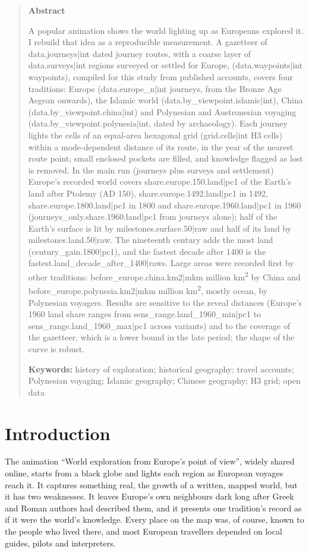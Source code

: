 \documentclass[11pt,a4paper]{article}
\begin{document}
\begin{quote}
\small
\begin{center}\textbf{Abstract}\end{center}
A popular animation shows the world lighting up as Europeans explored it. I rebuild that idea as a reproducible measurement. A gazetteer of {{data.journeys|int}} dated journey routes, with a coarse layer of {{data.surveys|int}} regions surveyed or settled for Europe, ({{data.waypoints|int}} waypoints), compiled for this study from published accounts, covers four traditions: Europe ({{data.europe_n|int}} journeys, from the Bronze Age Aegean onwards), the Islamic world ({{data.by_viewpoint.islamic|int}}), China ({{data.by_viewpoint.china|int}}) and Polynesian and Austronesian voyaging ({{data.by_viewpoint.polynesia|int}}, dated by archaeology). Each journey lights the cells of an equal-area hexagonal grid ({{grid.cells|int}} H3 cells) within a mode-dependent distance of its route, in the year of the nearest route point; small enclosed pockets are filled, and knowledge flagged as lost is removed. In the main run (journeys plus surveys and settlement) Europe's recorded world covers {{share.europe.150.land|pc1}} of the Earth's land after Ptolemy (AD 150), {{share.europe.1492.land|pc1}} in 1492, {{share.europe.1800.land|pc1}} in 1800 and {{share.europe.1960.land|pc1}} in 1960 ({{journeys_only.share.1960.land|pc1}} from journeys alone); half of the Earth's surface is lit by {{milestones.surface.50|raw}} and half of its land by {{milestones.land.50|raw}}. The nineteenth century adds the most land ({{century_gain.1800|pc1}}), and the fastest decade after 1400 is the {{fastest.land_decade_after_1400|raw}}s. Large areas were recorded first by other traditions: {{before_europe.china.km2|mkm}} million km\textsuperscript{2} by China and {{before_europe.polynesia.km2|mkm}} million km\textsuperscript{2}, mostly ocean, by Polynesian voyagers. Results are sensitive to the reveal distances (Europe's 1960 land share ranges from {{sens_range.land_1960_min|pc1}} to {{sens_range.land_1960_max|pc1}} across variants) and to the coverage of the gazetteer, which is a lower bound in the late period; the shape of the curve is robust.

\textbf{Keywords:} history of exploration; historical geography; travel accounts; Polynesian voyaging; Islamic geography; Chinese geography; H3 grid; open data
\end{quote}

\section{Introduction}
The animation ``World exploration from Europe's point of view'', widely shared online, starts from a black globe and lights each region as European voyages reach it. It captures something real, the growth of a written, mapped world, but it has two weaknesses. It leaves Europe's own neighbours dark long after Greek and Roman authors had described them, and it presents one tradition's record as if it were the world's knowledge. Every place on the map was, of course, known to the people who lived there, and most European travellers depended on local guides, pilots and interpreters.
\end{document}
